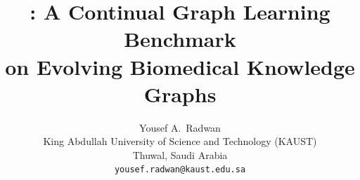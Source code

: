 \documentclass{article}
\title{\ours: A Continual Graph Learning Benchmark\\on Evolving Biomedical Knowledge Graphs}
\author{%
  Yousef A.~Radwan \\
  King Abdullah University of Science and Technology (KAUST)\\
  Thuwal, Saudi Arabia \\
  \texttt{yousef.radwan@kaust.edu.sa}
}
\begin{document}
\maketitle








{
\small


}
\end{document}
